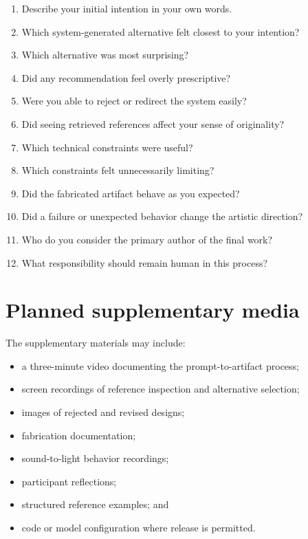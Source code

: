 \documentclass{article}
\begin{document}
\begin{enumerate}[leftmargin=*]
    \item Describe your initial intention in your own words.
    \item Which system-generated alternative felt closest to your intention?
    \item Which alternative was most surprising?
    \item Did any recommendation feel overly prescriptive?
    \item Were you able to reject or redirect the system easily?
    \item Did seeing retrieved references affect your sense of originality?
    \item Which technical constraints were useful?
    \item Which constraints felt unnecessarily limiting?
    \item Did the fabricated artifact behave as you expected?
    \item Did a failure or unexpected behavior change the artistic direction?
    \item Who do you consider the primary author of the final work?
    \item What responsibility should remain human in this process?
\end{enumerate}

\section{Planned supplementary media}

The supplementary materials may include:

\begin{itemize}[leftmargin=*]
    \item a three-minute video documenting the prompt-to-artifact process;
    \item screen recordings of reference inspection and alternative selection;
    \item images of rejected and revised designs;
    \item fabrication documentation;
    \item sound-to-light behavior recordings;
    \item participant reflections;
    \item structured reference examples; and
    \item code or model configuration where release is permitted.
\end{itemize}

% 
\end{document}

